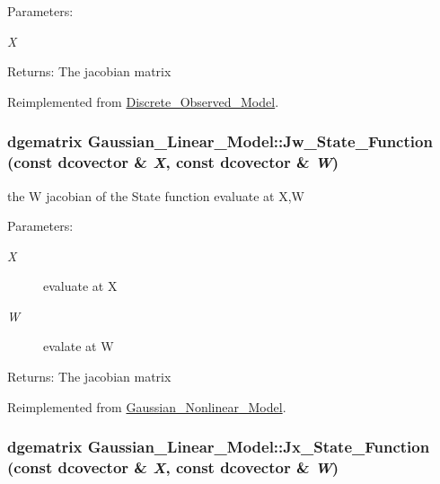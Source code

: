 \begin{Desc}
\item[Parameters:]
\begin{description}
\item[{\em X}]\end{description}
\end{Desc}
\begin{Desc}
\item[Returns:]The jacobian matrix \end{Desc}


Reimplemented from \hyperlink{class_discrete___observed___model_83cd1f2f54544d8977dbce844031f85e}{Discrete\_\-Observed\_\-Model}.\hypertarget{class_gaussian___linear___model_0df35cd7199676b9a03feec376aa49e7}{
\subsubsection[{Jw\_\-State\_\-Function}]{\setlength{\rightskip}{0pt plus 5cm}dgematrix Gaussian\_\-Linear\_\-Model::Jw\_\-State\_\-Function (const dcovector \& {\em X}, \/  const dcovector \& {\em W})}}
\label{class_gaussian___linear___model_0df35cd7199676b9a03feec376aa49e7}


the W jacobian of the State function evaluate at X,W 

\begin{Desc}
\item[Parameters:]
\begin{description}
\item[{\em X}]evaluate at X \item[{\em W}]evalate at W\end{description}
\end{Desc}
\begin{Desc}
\item[Returns:]The jacobian matrix \end{Desc}


Reimplemented from \hyperlink{class_gaussian___nonlinear___model_1c6710cedf6317e07b7b2a48f41f5442}{Gaussian\_\-Nonlinear\_\-Model}.\hypertarget{class_gaussian___linear___model_3fb2cc6feae8997ad99fce7e2b77a2ce}{
\subsubsection[{Jx\_\-State\_\-Function}]{\setlength{\rightskip}{0pt plus 5cm}dgematrix Gaussian\_\-Linear\_\-Model::Jx\_\-State\_\-Function (const dcovector \& {\em X}, \/  const dcovector \& {\em W})}}
\label{class_gaussian___linear___model_3fb2cc6feae8997ad99fce7e2b77a2ce}


